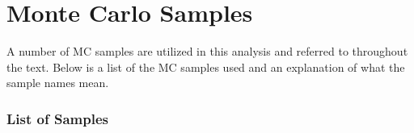 \documentclass[dissertation.tex]{subfiles}
\begin{document}
\appendix
\chapter{Monte Carlo Samples}
\label{chap:Monte Carlo Samples}

%



A number of MC samples are utilized in this analysis and referred to throughout the text.  Below is a list of the MC samples used and an explanation of what the sample names mean.

\subsection{List of Samples}
\label{sec:List of Samples}
\end{document}

